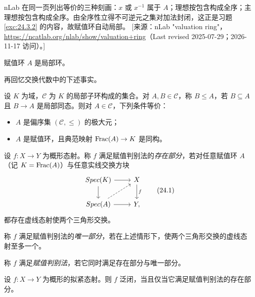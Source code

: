 \begin{yizhu}
nLab 在同一页列出等价的三种刻画：$x$ 或 $x^{-1}$ 属于 $A$；理想按包含构成全序；主理想按包含构成全序。由全序性立得不可逆元之集对加法封闭，这正是习题 \ref{exc:24.3.2} 的内容，故赋值环自动局部。
[来源：nLab "valuation ring"，\url{https://ncatlab.org/nlab/show/valuation+ring}（Last revised 2025-07-29；2026-11-17 访问）。]
\end{yizhu}

\begin{exercise}\label{exc:24.3.2}
赋值环 $A$ 是局部环。
\end{exercise}

再回忆交换代数中的下述事实。

\begin{lemma}\label{lem:24.3.3}
设 $K$ 为域，$\mathcal{C}$ 为 $K$ 的局部子环构成的集合。对 $A, B \in \mathcal{C}$，称 $B \le A$，若 $B \subseteq A$ 且 $B \to A$ 是局部同态。则对 $A \in \mathcal{C}$，下列条件等价：
\begin{itemize}
  \item $A$ 是偏序集 $(\mathcal{C}, \le)$ 的极大元；
  \item $A$ 是赋值环，且典范映射 $\operatorname{Frac}(A) \to K$ 是同构。
\end{itemize}
\end{lemma}

\begin{definition}\label{def:24.3.4}
设 $f\colon X \to Y$ 为概形态射。称 $f$ 满足赋值判别法的\emph{存在部分}，若对任意赋值环 $A$（记 $K = \operatorname{Frac}(A)$）与任意实线交换方块
\[
\begin{tikzcd}
\Spec(K) \arrow[r] \arrow[d] & X \arrow[d, "f"] \\
\Spec(A) \arrow[r] \arrow[ur, dashed] & Y,
\end{tikzcd}
\tag{24.1}\label{eq:24.1}
\]
都存在虚线态射使两个三角形交换。

称 $f$ 满足赋值判别法的\emph{唯一部分}，若在上述情形下，使两个三角形交换的虚线态射至多一个。

称 $f$ 满足\emph{赋值判别法}，若它同时满足存在部分与唯一部分。
\end{definition}

\begin{proposition}\label{prop:24.3.5}
设 $f\colon X \to Y$ 为概形的拟紧态射。则 $f$ 泛闭，当且仅当它满足赋值判别法的存在部分。
\end{proposition}

